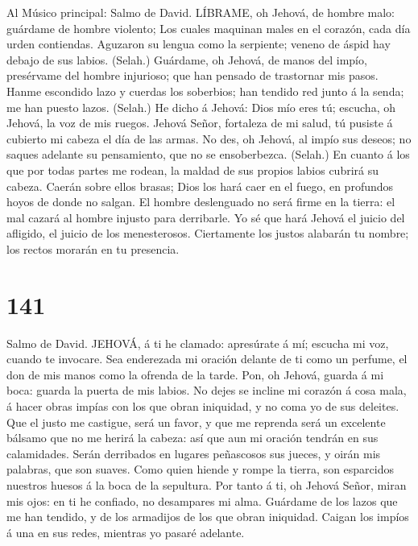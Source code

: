  Al Músico principal: Salmo de David. LÍBRAME, oh Jehová, de
hombre malo: guárdame de hombre violento;  Los cuales
maquinan males en el corazón, cada día urden contiendas. 
Aguzaron su lengua como la serpiente; veneno de áspid hay debajo de sus
labios. (Selah.)  Guárdame, oh Jehová, de manos del impío,
presérvame del hombre injurioso; que han pensado de trastornar mis
pasos.  Hanme escondido lazo y cuerdas los soberbios; han
tendido red junto á la senda; me han puesto lazos. (Selah.) 
He dicho á Jehová: Dios mío eres tú; escucha, oh Jehová, la voz de mis
ruegos.  Jehová Señor, fortaleza de mi salud, tú pusiste á
cubierto mi cabeza el día de las armas.  No des, oh Jehová,
al impío sus deseos; no saques adelante su pensamiento, que no se
ensoberbezca. (Selah.)  En cuanto á los que por todas partes
me rodean, la maldad de sus propios labios cubrirá su cabeza.
 Caerán sobre ellos brasas; Dios los hará caer en el fuego,
en profundos hoyos de donde no salgan.  El hombre
deslenguado no será firme en la tierra: el mal cazará al hombre injusto
para derribarle.  Yo sé que hará Jehová el juicio del
afligido, el juicio de los menesterosos.  Ciertamente los
justos alabarán tu nombre; los rectos morarán en tu presencia.

\hypertarget{section-140}{%
\section{141}\label{section-140}}

 Salmo de David. JEHOVÁ, á ti he clamado: apresúrate á mí;
escucha mi voz, cuando te invocare.  Sea enderezada mi
oración delante de ti como un perfume, el don de mis manos como la
ofrenda de la tarde.  Pon, oh Jehová, guarda á mi boca:
guarda la puerta de mis labios.  No dejes se incline mi
corazón á cosa mala, á hacer obras impías con los que obran iniquidad, y
no coma yo de sus deleites.  Que el justo me castigue, será
un favor, y que me reprenda será un excelente bálsamo que no me herirá
la cabeza: así que aun mi oración tendrán en sus calamidades.
 Serán derribados en lugares peñascosos sus jueces, y oirán
mis palabras, que son suaves.  Como quien hiende y rompe la
tierra, son esparcidos nuestros huesos á la boca de la sepultura.
 Por tanto á ti, oh Jehová Señor, miran mis ojos: en ti he
confiado, no desampares mi alma.  Guárdame de los lazos que
me han tendido, y de los armadijos de los que obran iniquidad.
 Caigan los impíos á una en sus redes, mientras yo pasaré
adelante.

